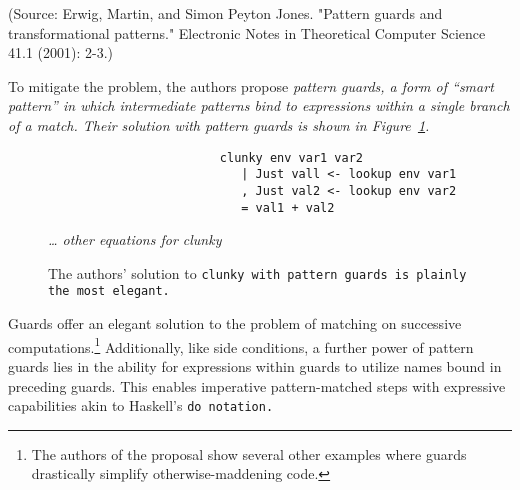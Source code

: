 \documentclass[manuscript,screen,review, 12pt]{acmart}
\begin{document}
    (Source: Erwig, Martin, and Simon Peyton Jones. "Pattern guards and transformational patterns." Electronic Notes in Theoretical Computer Science 41.1 (2001): 2-3.)

        To mitigate the problem, the authors propose \it{pattern guards}, a form
        of “smart pattern” in which intermediate patterns bind to
        expressions within a single branch of a match. Their solution with
        pattern guards is shown in Figure~\ref{fig:guardclunky}. 

    \begin{figure}[hbt!]  
        \begin{center}
        \begin{verbatim}
                        clunky env var1 var2    
                           | Just vall <- lookup env var1
                           , Just val2 <- lookup env var2
                           = val1 + val2
        \end{verbatim}
        \it{… other equations for clunky}
        \end{center}    
    \caption{The authors' solution to \tt{clunky} with pattern guards is plainly
    the most elegant.} 
    \label{fig:guardclunky}
    \end{figure}

    Guards offer an elegant solution to the problem of matching on successive
    computations.\footnote{The authors of the proposal show several other
    examples where guards drastically simplify otherwise-maddening code.}
    Additionally, like side conditions, a further power of pattern guards lies
    in the ability for expressions within guards to utilize names bound in
    preceding guards. This enables imperative pattern-matched steps with
    expressive capabilities akin to Haskell's \tt{do} notation.

\end{document}
